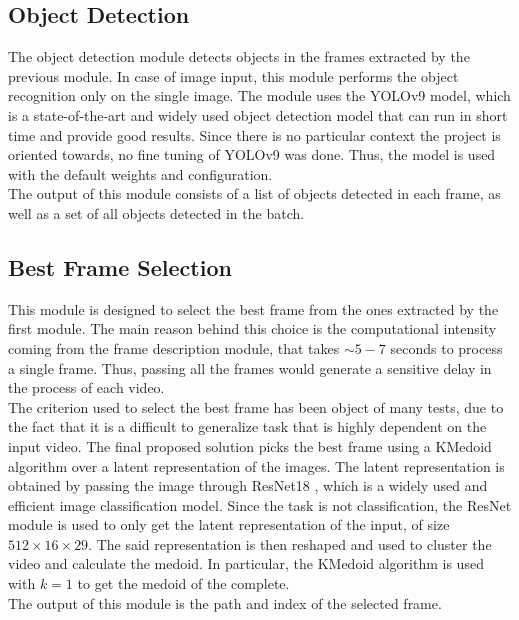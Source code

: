 \documentclass[conference]{IEEEtran}
\begin{document}
\subsection{Object Detection}
The object detection module detects objects in the frames extracted by the previous module. In case of image input, this module performs the object recognition only on the single image. 
The module uses the YOLOv9 \cite{yolo} model, which is a state-of-the-art and widely used object detection model that can run in short time and provide good results.
Since there is no particular context the project is oriented towards, no fine tuning of YOLOv9 was done. Thus, the model is used with the default weights and configuration. \\
The output of this module consists of a list of objects detected in each frame, as well as a set of all objects detected in the batch.

\subsection{Best Frame Selection}
This module is designed to select the best frame from the ones extracted by the first module. The main reason behind this choice is the computational intensity coming from the frame description module,
that takes $\sim 5-7$ seconds to process a single frame. Thus, passing all the frames would generate a sensitive delay in the process of each video. \\ 
The criterion used to select the best frame has been object of many tests, due to the fact that it is a difficult to generalize task that is highly dependent on the input video. 
The final proposed solution picks the best frame using a KMedoid algorithm over a latent representation of the images. The latent representation is obtained by passing the image through ResNet18 \cite{resnet}, which is a widely used and efficient image classification model. Since the task is not classification, the ResNet module is used to only get the latent representation of the input, of size $512 \times 16 \times 29 $. The said representation is then reshaped and used to cluster the video and calculate the medoid. In particular, the KMedoid algorithm is used with $k=1$ to get the medoid of the complete. \\
The output of this module is the path and index of the selected frame.  
\end{document}
